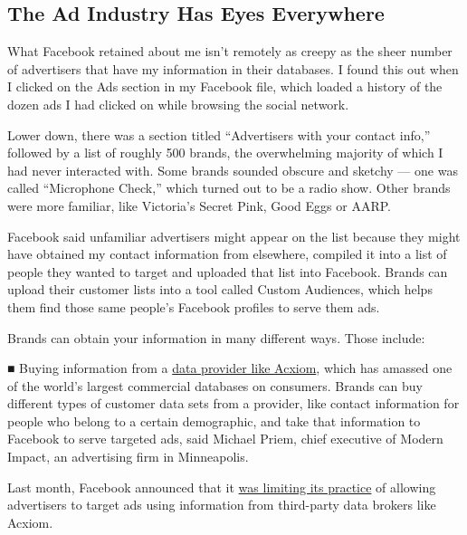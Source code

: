 \hypertarget{the-ad-industry-has-eyes-everywhere}{%
\subsection{The Ad Industry Has Eyes
Everywhere}\label{the-ad-industry-has-eyes-everywhere}}

What Facebook retained about me isn't remotely as creepy as the sheer
number of advertisers that have my information in their databases. I
found this out when I clicked on the Ads section in my Facebook file,
which loaded a history of the dozen ads I had clicked on while browsing
the social network.

Lower down, there was a section titled ``Advertisers with your contact
info,'' followed by a list of roughly 500 brands, the overwhelming
majority of which I had never interacted with. Some brands sounded
obscure and sketchy --- one was called ``Microphone Check,'' which
turned out to be a radio show. Other brands were more familiar, like
Victoria's Secret Pink, Good Eggs or AARP.

Facebook said unfamiliar advertisers might appear on the list because
they might have obtained my contact information from elsewhere, compiled
it into a list of people they wanted to target and uploaded that list
into Facebook. Brands can upload their customer lists into a tool called
Custom Audiences, which helps them find those same people's Facebook
profiles to serve them ads.

Brands can obtain your information in many different ways. Those
include:

■ Buying information from a
\href{https://www.nytimes3xbfgragh.onion/2012/06/17/technology/acxiom-the-quiet-giant-of-consumer-database-marketing.html}{data
provider like Acxiom}, which has amassed one of the world's largest
commercial databases on consumers. Brands can buy different types of
customer data sets from a provider, like contact information for people
who belong to a certain demographic, and take that information to
Facebook to serve targeted ads, said Michael Priem, chief executive of
Modern Impact, an advertising firm in Minneapolis.

Last month, Facebook announced that it
\href{https://www.nytimes3xbfgragh.onion/2018/03/28/technology/facebook-privacy-security-settings.html?rref=collection\%2Fbyline\%2Fnatasha-singer\&action=click\&contentCollection=undefined\&region=stream\&module=stream_unit\&version=latest\&contentPlacement=5\&pgtype=collection}{was
limiting its practice} of allowing advertisers to target ads using
information from third-party data brokers like Acxiom.

